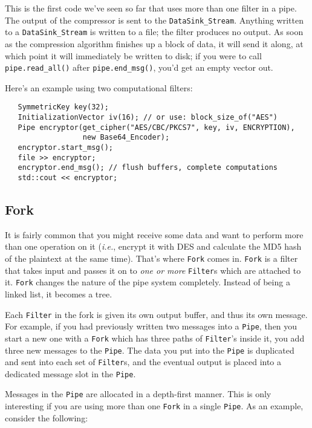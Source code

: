 \documentclass{article}
\newcommand{\type}[1]{\texttt{#1}}
\newcommand{\ie}[0]{\emph{i.e.}}
\begin{document}
This is the first code we've seen so far that uses more than one
filter in a pipe. The output of the compressor is sent to the
\type{DataSink\_Stream}. Anything written to a \type{DataSink\_Stream}
is written to a file; the filter produces no output. As soon as the
compression algorithm finishes up a block of data, it will send it along,
at which point it will immediately be written to disk; if you were to
call \verb|pipe.read_all()| after \verb|pipe.end_msg()|, you'd get an
empty vector out.

Here's an example using two computational filters:

\begin{verbatim}
   SymmetricKey key(32);
   InitializationVector iv(16); // or use: block_size_of("AES")
   Pipe encryptor(get_cipher("AES/CBC/PKCS7", key, iv, ENCRYPTION),
                  new Base64_Encoder);
   encryptor.start_msg();
   file >> encryptor;
   encryptor.end_msg(); // flush buffers, complete computations
   std::cout << encryptor;
\end{verbatim}

\subsection{Fork}

It is fairly common that you might receive some data and want to perform more
than one operation on it (\ie, encrypt it with DES and calculate the MD5 hash
of the plaintext at the same time). That's where \type{Fork} comes
in. \type{Fork} is a filter that takes input and passes it on to \emph{one or
more} \type{Filter}s which are attached to it. \type{Fork} changes the nature
of the pipe system completely. Instead of being a linked list, it becomes a
tree.

Each \type{Filter} in the fork is given its own output buffer, and
thus its own message. For example, if you had previously written two
messages into a \type{Pipe}, then you start a new one with a
\type{Fork} which has three paths of \type{Filter}'s inside it, you
add three new messages to the \type{Pipe}. The data you put into the
\type{Pipe} is duplicated and sent into each set of \type{Filter}s,
and the eventual output is placed into a dedicated message slot in the
\type{Pipe}.

Messages in the \type{Pipe} are allocated in a depth-first manner. This is only
interesting if you are using more than one \type{Fork} in a single \type{Pipe}.
As an example, consider the following:
\end{document}
